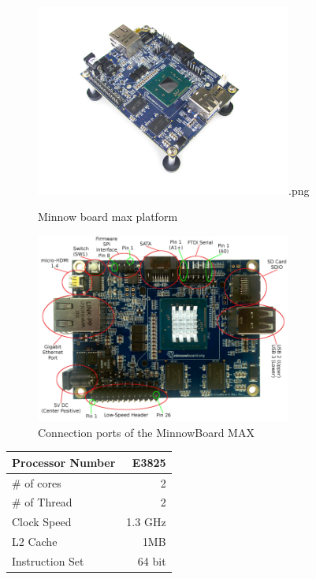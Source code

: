     \begin{figure}[H]
        \centering
        \includegraphics[width=0.75\textwidth]{images/minnow-max.jpg}.png
        \caption{Minnow board max platform}
        \label{fig:4.1}
    \end{figure}


    \begin{figure}[H]
        \centering
        \includegraphics[width=0.75\textwidth]{images/minnow-max-2.png}
        \caption{Connection ports of the  MinnowBoard MAX}
        \label{fig:4.2}
    \end{figure}

    \begin{center}
    \begin{tabular}{ | l | r |}
        \hline
        Processor Number & E3825  \\ \hline
        \# of cores & 2  \\ \hline
        \# of Thread & 2  \\ \hline
        Clock Speed & 1.3 GHz  \\ \hline
        L2 Cache & 1MB  \\ \hline
        Instruction Set & 64 bit  \\ \hline
    \end{tabular}
     \label{tab:4.1}
    \end{center}

